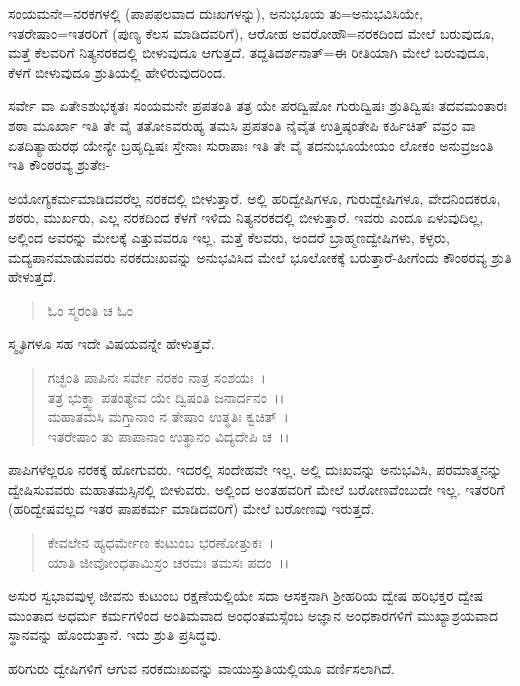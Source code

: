ಸಂಯಮನೇ=ನರಕಗಳಲ್ಲಿ (ಪಾಪಫಲವಾದ ದುಃಖಗಳನ್ನು), ಅನುಭೂಯ ತು=ಅನುಭವಿಸಿಯೇ, ಇತರೇಷಾಂ=ಇತರರಿಗೆ (ಪುಣ್ಯ ಕೆಲಸ ಮಾಡಿದವರಿಗೆ), ಆರೋಹ ಅವರೋಹೌ=ನರಕದಿಂದ ಮೇಲೆ ಬರುವುದೂ, ಮತ್ತೆ ಕೆಲವರಿಗೆ ನಿತ್ಯನರಕದಲ್ಲಿ ಬೀಳುವುದೂ ಆಗುತ್ತದೆ. ತದ್ದತಿದರ್ಶನಾತ್=ಈ ರೀತಿಯಾಗಿ ಮೇಲೆ ಬರುವುದೂ, ಕೆಳಗೆ ಬೀಳುವುದೂ ಶ್ರುತಿಯಲ್ಲಿ ಹೇಳಿರುವುದರಿಂದ.

ಸರ್ವೇ ವಾ ಏತೇಽಶುಭಕೃತಃ ಸಂಯಮನೇ ಪ್ರಪತಂತಿ ತತ್ರ ಯೇ ಪರದ್ವಿಷೋ ಗುರುದ್ವಿಷಃ ಶ್ರುತಿದ್ವಿಷಃ ತದವಮಂತಾರಃ ಶಠಾ ಮೂರ್ಖಾ ಇತಿ ತೇ ವೈ ತತೋಽವರುಹ್ಯ ತಮಸಿ ಪ್ರಪತಂತಿ ನೈವೈತ ಉತ್ತಿಷ್ಠಂತೇಪಿ ಕರ್ಹಿಚಿತ್ ವವ್ರಂ ವಾ ಏತದಿತ್ಯಾಹುರಥ ಯೇನ್ಯೇ ಬ್ರಹೃದ್ವಿಷಃ ಸ್ತೇನಾಃ ಸುರಾಪಾಃ ಇತಿ ತೇ ವೈ ತದನುಭೂಯೇಯಂ ಲೋಕಂ ಅನುವ್ರಜಂತಿ ಇತಿ ಕೌಂಠರವ್ಯ ಶ್ರುತೇಃ-

ಅಯೋಗ್ಯಕರ್ಮಮಾಡಿದವರೆಲ್ಲ ನರಕದಲ್ಲಿ ಬೀಳುತ್ತಾರೆ. ಅಲ್ಲಿ ಹರಿದ್ವೇಷಿಗಳೂ, ಗುರುದ್ವೇಷಿಗಳೂ, ವೇದನಿಂದಕರೂ, ಶಠರು, ಮುರ್ಖರು, ಎಲ್ಲ ನರಕದಿಂದ ಕೆಳಗೆ ಇಳಿದು ನಿತ್ಯನರಕದಲ್ಲಿ ಬೀಳುತ್ತಾರೆ. ಇವರು ಎಂದೂ ಏಳುವುದಿಲ್ಲ, ಅಲ್ಲಿಂದ ಅವರನ್ನು ಮೇಲಕ್ಕೆ ಎತ್ತುವವರೂ ಇಲ್ಲ. ಮತ್ತೆ ಕೆಲವರು, ಅಂದರೆ ಬ್ರಾಹ್ಮಣದ್ವೇಷಿಗಳು, ಕಳ್ಳರು, ಮದ್ಯಪಾನಮಾಡುವವರು ನರಕದುಃಖವನ್ನು ಅನುಭವಿಸಿದ ಮೇಲೆ ಭೂಲೋಕಕ್ಕೆ ಬರುತ್ತಾರೆ-ಹೀಗೆಂದು ಕೌಂಠರವ್ಯ ಶ್ರುತಿ ಹೇಳುತ್ತದೆ.

\begin{verse}
ಓಂ ಸ್ಮರಂತಿ ಚ ಓಂ
\end{verse}

ಸ್ಮೃತಿಗಳೂ ಸಹ ಇದೇ ವಿಷಯವನ್ನೇ ಹೇಳುತ್ತವೆ.

\begin{verse}
ಗಚ್ಛಂತಿ ಪಾಪಿನಃ ಸರ್ವೇ ನರಕಂ ನಾತ್ರ ಸಂಶಯಃ~।\\ ತತ್ರ ಭುಕ್ತ್ವಾ ಪತಂತ್ಯೇವ ಯೇ ದ್ವಿಷಂತಿ ಜನಾರ್ದನಂ~।।\\ ಮಹಾತಮಸಿ ಮಗ್ತಾನಾಂ ನ ತೇಷಾಂ ಉತ್ಥತಿಃ ಕ್ವಚಿತ್~।\\ ಇತರೇಷಾಂ ತು ಪಾಪಾನಾಂ ಉತ್ಥಾನಂ ವಿದ್ಯದೇಪಿ ಚ~।।
\end{verse}

ಪಾಪಿಗಳೆಲ್ಲರೂ ನರಕಕ್ಕೆ ಹೋಗುವರು. ಇದರಲ್ಲಿ ಸಂದೇಹವೇ ಇಲ್ಲ. ಅಲ್ಲಿ ದುಃಖವನ್ನು ಅನುಭವಿಸಿ, ಪರಮಾತ್ಮನನ್ನು ದ್ವೇಷಿಸುವವರು ಮಹಾತಮಸ್ಸಿನಲ್ಲಿ ಬೀಳುವರು. ಅಲ್ಲಿಂದ ಅಂತಹವರಿಗೆ ಮೇಲೆ ಬರೋಣವೆಂಬುದೇ ಇಲ್ಲ. ಇತರರಿಗೆ (ಹರಿದ್ವೇಷವಲ್ಲದ ಇತರ ಪಾಪಕರ್ಮ ಮಾಡಿದವರಿಗೆ) ಮೇಲೆ ಬರೋಣವು ಇರುತ್ತದೆ.

\begin{verse}
ಕೇವಲೇನ ಹ್ಯಧರ್ಮೇಣ ಕುಟುಂಬ ಭರಣೋತ್ತುಕಃ~।\\ ಯಾತಿ ಜೀವೋಂಧತಾಮಿಸ್ರಂ ಚರಮಃ ತಮಸಃ ಪದಂ~।।
\end{verse}


ಅಸುರ ಸ್ವಭಾವವುಳ್ಳ ಜೀವನು ಕುಟುಂಬ ರಕ್ಷಣೆಯಲ್ಲಿಯೇ ಸದಾ ಆಸಕ್ತನಾಗಿ ಶ‍್ರೀಹರಿಯ ದ್ವೇಷ ಹರಿಭಕ್ತರ ದ್ವೇಷ ಮುಂತಾದ ಅಧರ್ಮ ಕರ್ಮಗಳಿಂದ ಅಂತಿಮವಾದ ಅಂಧಂತಮಸ್ಸೆಂಬ ಅಜ್ಞಾನ ಅಂಧಕಾರಗಳಿಗೆ ಮುಖ್ಯಾಶ್ರಯವಾದ ಸ್ಥಾನವನ್ನು ಹೊಂದುತ್ತಾನೆ. ಇದು ಶ್ರುತಿ ಪ್ರಸಿದ್ಧವು.

ಹರಿಗುರು ದ್ವೇಷಿಗಳಿಗೆ ಆಗುವ ನರಕದುಃಖವನ್ನು ವಾಯುಸ್ತುತಿಯಲ್ಲಿಯೂ ವರ್ಣಿಸಲಾಗಿದೆ.

